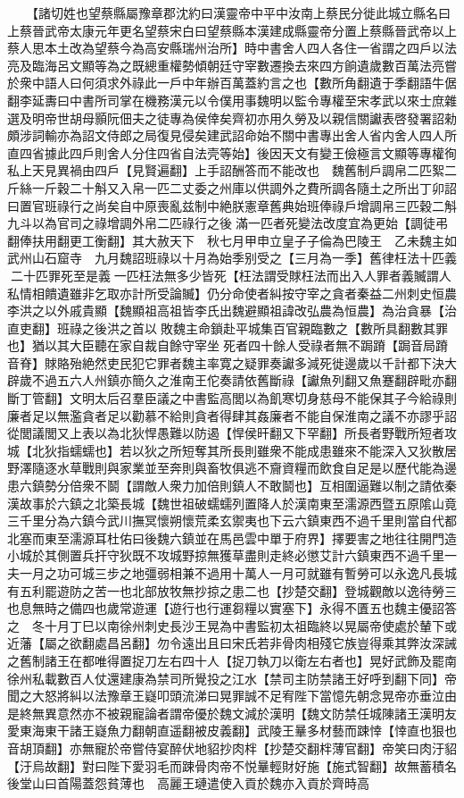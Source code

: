 　　【諸切姓也望蔡縣屬豫章郡沈約曰漢靈帝中平中汝南上蔡民分徙此城立縣名曰上蔡晉武帝太康元年更名望蔡宋白曰望蔡縣本漢建成縣靈帝分置上蔡縣晉武帝以上蔡人思本土改為望蔡今為高安縣瑞州治所】時中書舍人四人各住一省謂之四戶以法亮及臨海呂文顯等為之既總重權勢傾朝廷守宰數遷換去來四方餉遺歲數百萬法亮嘗於衆中語人曰何須求外祿此一戶中年辦百萬蓋約言之也【數所角翻遺于季翻語牛倨翻李延夀曰中書所司掌在機務漢元以令僕用事魏明以監令專權至宋孝武以來士庶雜選及明帝世胡母顥阮佃夫之徒專為侯倖矣齊初亦用久勞及以親信關讞表啓發署詔勑頗涉詞輸亦為詔文侍郎之局復見侵矣建武詔命始不關中書專出舍人省内舍人四人所直四省據此四戶則舍人分住四省自法壳等始】後因天文有變王儉極言文顯等專權徇私上天見異禍由四戶【見賢遍翻】上手詔酬答而不能改也　魏舊制戶調帛二匹絮二斤絲一斤穀二十斛又入帛一匹二丈委之州庫以供調外之費所調各隨土之所出丁卯詔曰置官班祿行之尚矣自中原喪亂兹制中絶朕憲章舊典始班俸祿戶增調帛三匹穀二斛九斗以為官司之祿增調外帛二匹祿行之後滿一匹者死變法改度宜為更始【調徒弔翻俸扶用翻更工衡翻】其大赦天下　秋七月甲申立皇子子倫為巴陵王　乙未魏主如武州山石窟寺　九月魏詔班祿以十月為始季别受之【三月為一季】舊律枉法十匹義二十匹罪死至是義一匹枉法無多少皆死【枉法謂受賕枉法而出入人罪者義贓謂人私情相饋遺雖非乞取亦計所受論贓】仍分命使者糾按守宰之貪者秦益二州刺史恒農李洪之以外戚貴顯【魏顯祖高祖皆李氏出魏避顯祖諱改弘農為恒農】為治貪暴【治直吏翻】班祿之後洪之首以敗魏主命鎖赴平城集百官親臨數之【數所具翻數其罪也】猶以其大臣聽在家自裁自餘守宰坐死者四十餘人受祿者無不跼蹐【跼音局蹐音脊】賕賂殆絶然吏民犯它罪者魏主率寛之疑罪奏讞多減死徙邊歲以千計都下決大辟歲不過五六人州鎮亦簡久之淮南王佗奏請依舊斷祿【讞魚列翻又魚蹇翻辟毗亦翻斷丁管翻】文明太后召羣臣議之中書監高閭以為飢寒切身慈母不能保其子今給祿則廉者足以無濫貪者足以勸慕不給則貪者得肆其姦廉者不能自保淮南之議不亦謬乎詔從閭議閭又上表以為北狄悍愚難以防遏【悍侯旰翻又下罕翻】所長者野戰所短者攻城【北狄指蠕蠕也】若以狄之所短奪其所長則雖衆不能成患雖來不能深入又狄散居野澤隨逐水草戰則與家業並至奔則與畜牧俱逃不齎資糧而飲食自足是以歷代能為邊患六鎮勢分倍衆不鬬【謂敵人衆力加倍則鎮人不敢鬬也】互相圍逼難以制之請依秦漢故事於六鎮之北築長城【魏世祖破蠕蠕列置降人於漢南東至濡源西暨五原隂山竟三千里分為六鎮今武川撫冥懷朔懷荒柔玄禦夷也下云六鎮東西不過千里則當自代都北塞而東至濡源耳杜佑曰後魏六鎮並在馬邑雲中單于府界】擇要害之地往往開門造小城於其側置兵扞守狄既不攻城野掠無獲草盡則走終必懲艾計六鎮東西不過千里一夫一月之功可城三步之地彊弱相兼不過用十萬人一月可就雖有暫勞可以永逸凡長城有五利罷遊防之苦一也北部放牧無抄掠之患二也【抄楚交翻】登城觀敵以逸待勞三也息無時之備四也歲常遊運【遊行也行運芻糧以實塞下】永得不匱五也魏主優詔答之　冬十月丁巳以南徐州刺史長沙王晃為中書監初太祖臨終以晃屬帝使處於輦下或近藩【屬之欲翻處昌呂翻】勿令遠出且曰宋氏若非骨肉相殘它族豈得乘其弊汝深誡之舊制諸王在都唯得置捉刀左右四十人【捉刀執刀以衛左右者也】晃好武飾及罷南徐州私載數百人仗還建康為禁司所覺投之江水【禁司主防禁諸王好呼到翻下同】帝聞之大怒將糾以法豫章王嶷叩頭流涕曰晃罪誠不足宥陛下當憶先朝念晃帝亦垂泣由是終無異意然亦不被親寵論者謂帝優於魏文減於漢明【魏文防禁任城陳諸王漢明友愛東海東干諸王嶷魚力翻朝直遥翻被皮義翻】武陵王曅多材藝而踈悻【悻直也狠也音胡頂翻】亦無寵於帝嘗侍宴醉伏地貂抄肉柈【抄楚交翻柈薄官翻】帝笑曰肉汙貂【汙烏故翻】對曰陛下愛羽毛而踈骨肉帝不悦曅輕財好施【施式智翻】故無蓄積名後堂山曰首陽蓋怨貧薄也　高麗王璉遣使入貢於魏亦入貢於齊時高
